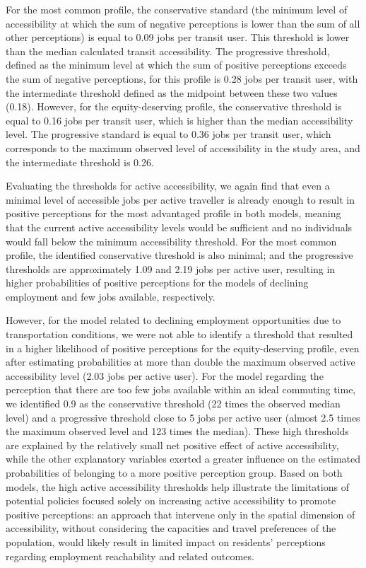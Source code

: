 \documentclass[preprint, 3p,
authoryear]{elsarticle} %
\begin{document}
For the most common profile, the conservative standard (the minimum
level of accessibility at which the sum of negative perceptions is lower
than the sum of all other perceptions) is equal to 0.09 jobs per transit
user. This threshold is lower than the median calculated transit
accessibility. The progressive threshold, defined as the minimum level
at which the sum of positive perceptions exceeds the sum of negative
perceptions, for this profile is 0.28 jobs per transit user, with the
intermediate threshold defined as the midpoint between these two values
(0.18). However, for the equity-deserving profile, the conservative
threshold is equal to 0.16 jobs per transit user, which is higher than
the median accessibility level. The progressive standard is equal to
0.36 jobs per transit user, which corresponds to the maximum observed
level of accessibility in the study area, and the intermediate threshold
is 0.26.

Evaluating the thresholds for active accessibility, we again find that
even a minimal level of accessible jobs per active traveller is already
enough to result in positive perceptions for the most advantaged profile
in both models, meaning that the current active accessibility levels
would be sufficient and no individuals would fall below the minimum
accessibility threshold. For the most common profile, the identified
conservative threshold is also minimal; and the progressive thresholds
are approximately 1.09 and 2.19 jobs per active user, resulting in
higher probabilities of positive perceptions for the models of declining
employment and few jobs available, respectively.

However, for the model related to declining employment opportunities due
to transportation conditions, we were not able to identify a threshold
that resulted in a higher likelihood of positive perceptions for the
equity-deserving profile, even after estimating probabilities at more
than double the maximum observed active accessibility level (2.03 jobs
per active user). For the model regarding the perception that there are
too few jobs available within an ideal commuting time, we identified 0.9
as the conservative threshold (22 times the observed median level) and a
progressive threshold close to 5 jobs per active user (almost 2.5 times
the maximum observed level and 123 times the median). These high
thresholds are explained by the relatively small net positive effect of
active accessibility, while the other explanatory variables exerted a
greater influence on the estimated probabilities of belonging to a more
positive perception group. Based on both models, the high active
accessibility thresholds help illustrate the limitations of potential
policies focused solely on increasing active accessibility to promote
positive perceptions: an approach that intervene only in the spatial
dimension of accessibility, without considering the capacities and
travel preferences of the population, would likely result in limited
impact on residents' perceptions regarding employment reachability and
related outcomes.
\end{document}
